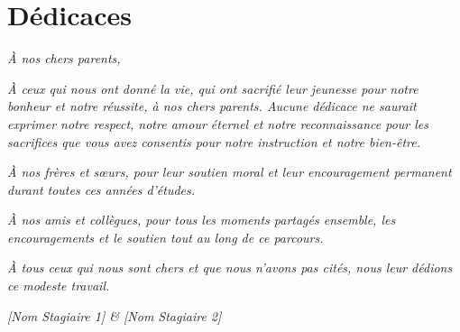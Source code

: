 
\chapter*{D\'{e}dicaces}

\thispagestyle{empty}

\vspace*{3cm}

\begin{center}
  \textit{\large \`{A} nos chers parents,}
\end{center}

\vspace{1cm}

\noindent
\textit{%
\`{A} ceux qui nous ont donn\'{e} la vie, qui ont sacrifi\'{e} leur jeunesse pour
notre bonheur et notre r\'{e}ussite, \`{a} nos chers parents. Aucune d\'{e}dicace ne
saurait exprimer notre respect, notre amour \'{e}ternel et notre reconnaissance
pour les sacrifices que vous avez consentis pour notre instruction et notre
bien-\^{e}tre.%
}

\vspace{1cm}

\noindent
\textit{%
\`{A} nos fr\`{e}res et s\oe urs, pour leur soutien moral et leur encouragement
permanent durant toutes ces ann\'{e}es d'\'{e}tudes.%
}

\vspace{1cm}

\noindent
\textit{%
\`{A} nos amis et coll\`{e}gues, pour tous les moments partag\'{e}s ensemble, les
encouragements et le soutien tout au long de ce parcours.%
}

\vspace{1cm}

\noindent
\textit{%
\`{A} tous ceux qui nous sont chers et que nous n'avons pas cit\'{e}s, nous leur
d\'{e}dions ce modeste travail.%
}

\vspace{2cm}

\begin{flushright}
  \textit{[Nom Stagiaire 1] \& [Nom Stagiaire 2]}
\end{flushright}

\newpage
